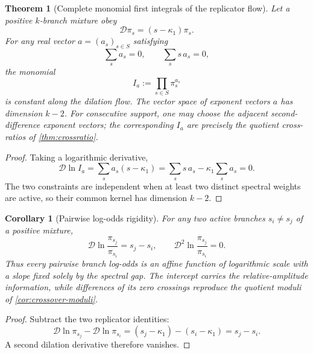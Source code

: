 \documentclass[aps,prd,preprint,onecolumn,nofootinbib,superscriptaddress,showkeys]{revtex4-2}
\numberwithin{equation}{section}
\theoremstyle{definition}
\theoremstyle{plain}
\newtheorem{theorem}{Theorem}[section]
\newtheorem{corollary}{Corollary}[section]
\newcommand{\Dil}{\mathscr D}
\begin{document}
\begin{theorem}[Complete monomial first integrals of the replicator flow]\label{thm:replicator-integrals}
Let a positive $k$-branch mixture obey
\[
\Dil\pi_s=(s-\kappa_1)\pi_s.
\]
For any real vector $a=(a_s)_{s\in S}$ satisfying
\begin{equation}
\sum_s a_s=0,
\qquad
\sum_s s\,a_s=0,
\end{equation}
the monomial
\begin{equation}
\boxed{
I_a:=\prod_{s\in S}\pi_s^{a_s}
}
\end{equation}
is constant along the dilation flow.  The vector space of exponent vectors $a$ has dimension $k-2$.  For consecutive support, one may choose the adjacent second-difference exponent vectors; the corresponding $I_a$ are precisely the quotient cross-ratios of \cref{thm:crossratio}.
\end{theorem}

\begin{proof}
Taking a logarithmic derivative,
\[
\Dil\ln I_a
=
\sum_s a_s(s-\kappa_1)
=
\sum_s s\,a_s-\kappa_1\sum_s a_s=0.
\]
The two constraints are independent when at least two distinct spectral weights are active, so their common kernel has dimension $k-2$.
\end{proof}

\begin{corollary}[Pairwise log-odds rigidity]\label{cor:logodds}
For any two active branches $s_i\ne s_j$ of a positive mixture,
\begin{equation}
\boxed{
\Dil\ln\frac{\pi_{s_j}}{\pi_{s_i}}=s_j-s_i,
\qquad
\Dil^2\ln\frac{\pi_{s_j}}{\pi_{s_i}}=0.
}
\end{equation}
Thus every pairwise branch log-odds is an affine function of logarithmic scale with a slope fixed solely by the spectral gap.  The intercept carries the relative-amplitude information, while differences of its zero crossings reproduce the quotient moduli of \cref{cor:crossover-moduli}.
\end{corollary}

\begin{proof}
Subtract the two replicator identities:
\[
\Dil\ln\pi_{s_j}-\Dil\ln\pi_{s_i}
=(s_j-\kappa_1)-(s_i-\kappa_1)=s_j-s_i.
\]
A second dilation derivative therefore vanishes.
\end{proof}
\end{document}
